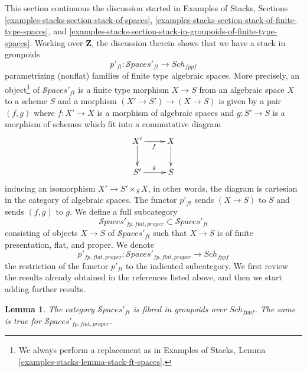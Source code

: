 \documentclass{stacks-project}
\theoremstyle{plain}
\newtheorem{lemma}[subsection]{Lemma}
\theoremstyle{definition}
\theoremstyle{remark}
\numberwithin{equation}{subsection}
\def\Sch{\mathit{Sch}}
\def\Spacesstack{\mathcal{S}\!\mathit{paces}}
\begin{document}
\noindent
This section continuous the discussion started in
Examples of Stacks, Sections
\ref{examples-stacks-section-stack-of-spaces},
\ref{examples-stacks-section-stack-of-finite-type-spaces}, and
\ref{examples-stacks-section-stack-in-groupoids-of-finite-type-spaces}.
Working over $\mathbf{Z}$, the discussion therein shows
that we have a stack in groupoids
$$
p'_{ft} : \Spacesstack'_{ft} \longrightarrow \Sch_{fppf}
$$
parametrizing (nonflat) families of finite type algebraic spaces.
More precisely, an object\footnote{We always perform a replacement as in
Examples of Stacks, Lemma \ref{examples-stacks-lemma-stack-ft-spaces}.}
of $\Spacesstack'_{ft}$ is a finite type morphism $X \to S$
from an algebraic space $X$ to a scheme $S$ and a morphism
$(X' \to S') \to (X \to S)$ is given by a pair $(f, g)$
where $f : X' \to X$ is a morphism of algebraic spaces
and $g : S' \to S$ is a morphism of schemes
which fit into a commutative diagram
$$
\xymatrix{
X' \ar[d] \ar[r]_f & X \ar[d] \\
S' \ar[r]^g & S
}
$$
inducing an isomorphism $X' \to S' \times_S X$, in other words, the
diagram is cartesian in the category of algebraic spaces.
The functor $p'_{ft}$ sends $(X \to S)$ to $S$ and sends
$(f, g)$ to $g$. We define a full subcategory
$$
\Spacesstack'_{fp, flat, proper} \subset
\Spacesstack'_{ft}
$$
consisting of objects $X \to S$ of $\Spacesstack'_{ft}$
such that $X \to S$ is of finite presentation, flat, and proper.
We denote
$$
p'_{fp, flat, proper} :
\Spacesstack'_{fp, flat, proper}
\longrightarrow
\Sch_{fppf}
$$
the restriction of the functor $p'_{ft}$ to the indicated subcategory.
We first review the results already obtained in the references
listed above, and then we start adding further results.

\begin{lemma}
\label{lemma-spaces-fibred-in-groupoids}
The category $\Spacesstack'_{ft}$ is fibred in groupoids
over $\Sch_{fppf}$. The same is true for
$\Spacesstack'_{fp, flat, proper}$.
\end{lemma}
\end{document}
